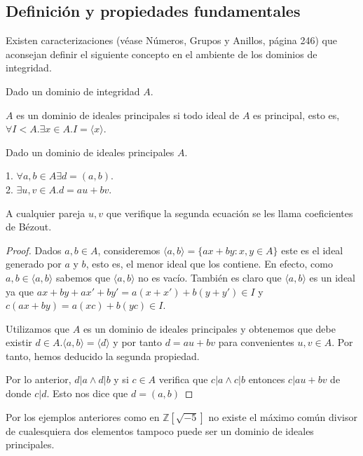 \subsection{Definición y propiedades fundamentales}

Existen caracterizaciones (véase Números, Grupos y Anillos, página 246) que aconsejan definir el siguiente concepto en el ambiente de los dominios de integridad. 

\begin{definition}
Dado un dominio de integridad $A$. 

$A$ es un dominio de ideales principales si todo ideal de $A$ es principal, esto es, $\forall I < A. \exists x \in A. I = \langle x \rangle$. 
\end{definition}

\begin{theorem}
Dado un dominio de ideales principales $A$. 

1. $\forall a,b \in A \exists d=(a,b)$.\\
2. $\exists u,v \in A. d = au+bv$. 

A cualquier pareja $u,v$ que verifique la segunda ecuación se les llama coeficientes de Bézout. 
\end{theorem}
\begin{proof}
Dados $a,b \in A$, consideremos $\langle a,b \rangle = \{ax+by:x,y \in A\}$ este es el ideal generado por $a$ y $b$, esto es, el menor ideal que los contiene. En efecto, como $a,b \in \langle a,b \rangle$ sabemos que $\langle a,b \rangle$ no es vacío. También es claro que $\langle a,b \rangle$ es un ideal ya que $ax+by + ax' +by' = a(x+x')+b(y+y') \in I$ y $c(ax+by) = a(xc)+b(yc) \in I$. 

Utilizamos que $A$ es un dominio de ideales principales y obtenemos que debe existir $d \in A.\langle a,b \rangle = \langle d \rangle$ y por tanto $d = au+bv$ para convenientes $u,v \in A$. Por tanto, hemos deducido la segunda propiedad.

Por lo anterior, $d|a \land d|b$ y si $c \in A$ verifica que $c|a \land c|b$ entonces $c|au+bv$ de donde $c|d$. Esto nos dice que $d = (a,b)$
\end{proof}

\begin{example}
Por los ejemplos anteriores como en $\mathbb{Z}[\sqrt{-5}]$ no existe el máximo común divisor de cualesquiera dos elementos tampoco puede ser un dominio de ideales principales. 
\end{example}


